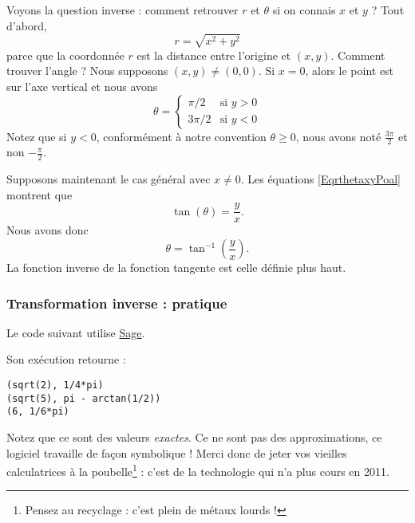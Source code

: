 Voyons la question inverse : comment retrouver $r$ et $\theta$ si on connais $x$ et $y$ ? Tout d'abord,
\begin{equation}
	r=\sqrt{x^2+y^2}
\end{equation}
parce que la coordonnée $r$ est la distance entre l'origine et $(x,y)$. Comment trouver l'angle ? Nous supposons $(x,y)\neq (0,0)$. Si $x=0$, alors le point est sur l'axe vertical et nous avons
\begin{equation}
	\theta=\begin{cases}
		\pi/2	&	\text{si }y>0\\
		3\pi/2	&	 \text{si }y<0
	\end{cases}
\end{equation}
Notez que si $y<0$, conformément à notre convention $\theta\geq 0$, nous avons noté $\frac{ 3\pi }{2}$ et non $-\frac{ \pi }{ 2 }$.

Supposons maintenant le cas général avec $x\neq 0$. Les équations \eqref{EqrthetaxyPoal} montrent que
\begin{equation}
	\tan(\theta)=\frac{ y }{ x }.
\end{equation}
Nous avons donc
\begin{equation}
	\theta=\tan^{-1}\left( \frac{ y }{ x } \right).
\end{equation}
La fonction inverse de la fonction tangente est celle définie plus haut.

\subsubsection{Transformation inverse : pratique}

Le code suivant utilise \href{http://www.sagemath.org}{Sage}.



Son exécution retourne :
\begin{verbatim}
(sqrt(2), 1/4*pi)
(sqrt(5), pi - arctan(1/2))
(6, 1/6*pi)
\end{verbatim}
Notez que ce sont des valeurs \emph{exactes}. Ce ne sont pas des approximations, ce logiciel travaille de façon symbolique ! Merci donc de jeter vos vieilles calculatrices à la poubelle\footnote{Pensez au recyclage : c'est plein de métaux lourds !} : c'est de la technologie qui n'a plus cours en 2011.


